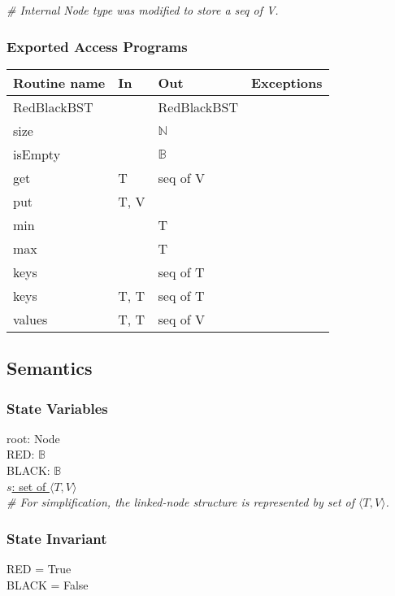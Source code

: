 \documentclass[12pt]{article}
\begin{document}
\noindent \textit{\# Internal Node type was modified to store a seq of V.}

\subsubsection* {Exported Access Programs}

\begin{tabular}{| l | l | l | l |}
\hline
\textbf{Routine name} & \textbf{In} & \textbf{Out} & \textbf{Exceptions}\\
\hline
RedBlackBST & ~ & RedBlackBST & \\
\hline
size & ~ & $\mathbb{N}$ & ~\\
\hline
isEmpty & ~ & $\mathbb{B}$ & ~\\
\hline
get & T & seq of V & ~\\
\hline
put & T, V & ~ & ~\\
\hline
min & ~ & T & ~\\
\hline
max & ~ & T & ~\\
\hline
keys & ~ & seq of T & ~\\
\hline
keys &  T, T & seq of T & ~\\
\hline
values & T, T & seq of V & ~\\
\hline
\end{tabular}

\subsection* {Semantics}

\subsubsection* {State Variables}

root: Node\\
RED: $\mathbb{B}$\\
BLACK: $\mathbb{B}$\\
\underline{$s$: set of $\langle T, V \rangle$}\\

\noindent \textit{\# For simplification, the linked-node structure is represented by set of $\langle T, V \rangle$.}\\

\subsubsection* {State Invariant}

RED = True\\
BLACK = False
\end{document}
